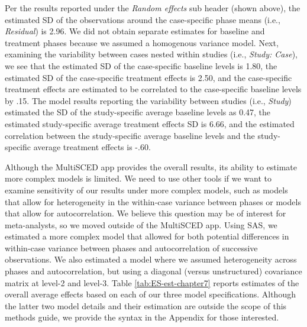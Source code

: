 \documentclass[
]{book}
\begin{document}
Per the results reported under the \emph{Random effects} sub header (shown above), the estimated SD of the observations around the case-specific phase means (i.e., \emph{Residual}) is 2.96. We did not obtain separate estimates for baseline and treatment phases because we assumed a homogenous variance model. Next, examining the variability between cases nested within studies (i.e., \emph{Study: Case}), we see that the estimated SD of the case-specific baseline levels is 1.80, the estimated SD of the case-specific treatment effects is 2.50, and the case-specific treatment effects are estimated to be correlated to the case-specific baseline levels by .15. The model results reporting the variability between studies (i.e., \emph{Study}) estimated the SD of the study-specific average baseline levels as 0.47, the estimated study-specific average treatment effects SD is 6.66, and the estimated correlation between the study-specific average baseline levels and the study-specific average treatment effects is -.60.

Although the MultiSCED app provides the overall results, its ability to estimate more complex models is limited. We need to use other tools if we want to examine sensitivity of our results under more complex models, such as models that allow for heterogeneity in the within-case variance between phases or models that allow for autocorrelation. We believe this question may be of interest for meta-analysts, so we moved outside of the MultiSCED app. Using SAS, we estimated a more complex model that allowed for both potential differences in within-case variance between phases and autocorrelation of successive observations. We also estimated a model where we assumed heterogeneity across phases and autocorrelation, but using a diagonal (versus unstructured) covariance matrix at level-2 and level-3. Table \ref{tab:ES-est-chapter7} reports estimates of the overall average effects based on each of our three model specifications. Although the latter two model details and their estimation are outside the scope of this methods guide, we provide the syntax in the Appendix for those interested.

\begin{table}

\caption{\label{tab:ES-est-chapter7}Estimates Obtained Across Model Variations}
\centering
{}
\end{table}
\end{document}
